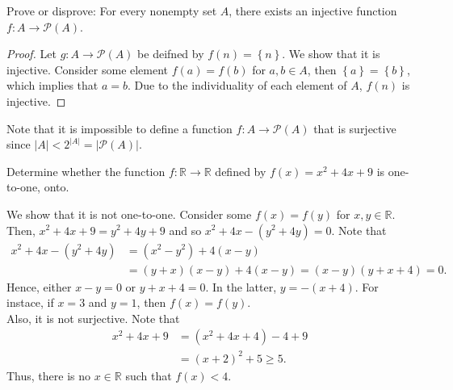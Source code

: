 \documentclass[12pt]{article}
\newcommand{\R}{\mathbb{R}}
\newenvironment{problem}[2][Problem]{\begin{trivlist} \item[\hskip \labelsep {\bfseries #1}\hskip \labelsep {\bfseries #2.}]}{\end{trivlist}}
\newenvironment{solution}[1][Solution]{\begin{trivlist} \item[\hskip \labelsep {\bfseries #1}]}{\end{trivlist}}
\begin{document}
    \begin{problem}{23}
      Prove or disprove: For every nonempty set $A$, there exists an injective function $f:A\to \mathcal{P}(A)$.
      \begin{proof}
	Let $g:A\to \mathcal{P}(A)$ be deifned by $f(n)=\left\{ n \right\}$. We show that it is injective. Consider some element $f(a)=f(b)$ for $a,b\in A$, then $\left\{ a \right\}=\left\{ b \right\}$, which implies that $a=b$. Due to the individuality of each element of $A$, $f(n)$ is injective.	
    \end{proof}
    Note that it is impossible to define a function $f:A\to \mathcal{P}(A)$ that is surjective since $|A|<2^{|A|} = |\mathcal{P}(A)|$. 
    \end{problem}
    \begin{problem}{24}
      Determine whether the function $f:\R\to \R$ defined by $f(x)=x^{2}+4x+9$ is one-to-one, onto.
    \begin{solution}
      We show that it is not one-to-one. Consider some $f(x)=f(y)$ for $x,y\in \R$. Then, $x^{2}+4x+9 = y^{2}+4y+9$ and so $x^{2}+4x - (y^{2}+4y)=0$. Note that  
    \begin{align*}
      x^{2}+4x-(y^{2}+4y) &= (x^{2}-y^{2})+4(x-y)\\
      &= (y+x)(x-y)+4(x-y) = (x-y)(y+x+4) = 0.
    \end{align*}
    Hence, either $x-y=0$ or $y+x+4=0$. In the latter, $y=-(x+4)$. For instace, if $x=3$ and $y=1$, then $f(x)=f(y)$.\\
    Also, it is not surjective. Note that   
    \begin{align*}
    x^{2}+4x+9 &= \left(x^{2}+4x+4\right)-4+9\\
    &= \left(x+2\right)^{2}+5\geq 5.
    \end{align*}
    Thus, there is no $x\in \R$ such that $f(x)<4$.
    \end{solution}
    \end{problem}
\end{document}

